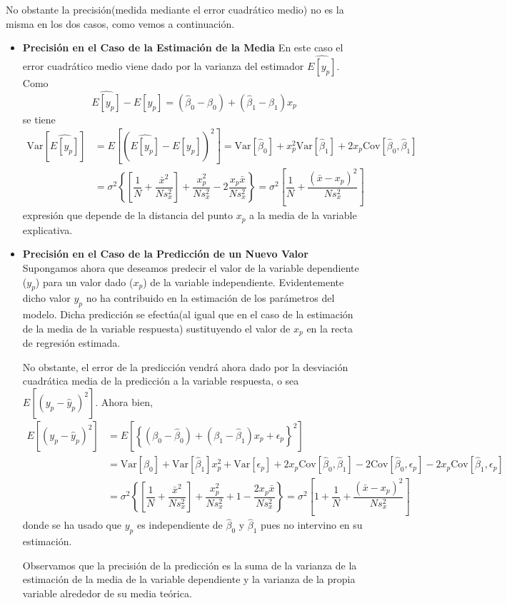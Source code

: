 \documentclass[10pt,a4paper]{book}
\begin{document}
No obstante la precisión(medida mediante el error cuadrático medio) no es la misma en los dos casos, como vemos a continuación.

\begin{itemize}
\item \textbf{Precisión en el Caso de la Estimación de la Media}
En este caso el error cuadrático medio viene dado por la varianza del estimador $\widehat{E[y_p]}$. Como $$\widehat{E[y_p]}-E[y_p]=(\widehat{\beta}_0-\beta_0)+(\widehat{\beta}_1-\beta_1)x_p$$ se tiene
\begin{equation*}
\begin{split}
\mathrm{Var}[\widehat{E[y_p]}]&=E[(\widehat{E[y_p]}-E[y_p])^2]=\mathrm{Var}[\widehat{\beta}_0]+x^2_p\mathrm{Var}[\widehat{\beta}_1]+2x_p\mathrm{Cov}[\widehat{\beta}_0,\widehat{\beta}_1]\\
&=\sigma^2\left\lbrace\left[\dfrac{1}{N}+\dfrac{\bar{x}^2}{Ns^2_x}\right]+\dfrac{x^2_p}{Ns^2_x}-2\dfrac{x_p\bar{x}}{Ns^2_x}\right\rbrace=\sigma^2\left[\dfrac{1}{N}+\dfrac{(\bar{x}-x_p)^2}{Ns^2_x}\right]
\end{split}
\end{equation*}
expresión que depende de la distancia del punto $x_p$ a la media de la variable explicativa.
\item \textbf{Precisión en el Caso de la Predicción de un Nuevo Valor}
Supongamos ahora que deseamos predecir el valor de la variable dependiente ($y_p$) para un valor dado ($x_p$) de la variable independiente. Evidentemente dicho valor $y_p$ no ha contribuido en la estimación de los parámetros del modelo. Dicha predicción se efectúa(al igual que en el caso de la estimación de la media de la variable respuesta) sustituyendo el valor de $x_p$ en la recta de regresión estimada.

No obstante, el error de la predicción vendrá ahora dado por la desviación cuadrática media de la predicción a la variable respuesta, o sea $E[(y_p-\widehat{y}_p)^2]$. Ahora bien,
\begin{equation*}
\begin{split}
E[(y_p-\widehat{y}_p)^2]&=E\left[\left\lbrace(\beta_0-\widehat{\beta}_0)+(\beta_1-\widehat{\beta}_1)x_p+\epsilon_p\right\rbrace^2\right]\\
&=\mathrm{Var}[\widehat{\beta}_0]+\mathrm{Var}[\widehat{\beta}_1]x^2_p+\mathrm{Var}[\epsilon_p]+2x_p\mathrm{Cov}[\widehat{\beta}_0,\widehat{\beta}_1]-2\mathrm{Cov}[\widehat{\beta}_0,\epsilon_p]-2x_p\mathrm{Cov}[\widehat{\beta}_1,\epsilon_p]\\
&=\sigma^2\left\lbrace\left[\dfrac{1}{N}+\dfrac{\bar{x}^2}{Ns^2_x}\right]+\dfrac{x^2_p}{Ns^2_x}+1-\dfrac{2x_p\bar{x}}{Ns^2_x}\right\rbrace=\sigma^2\left[1+\dfrac{1}{N}+\dfrac{(\bar{x}-x_p)^2}{Ns^2_x}\right]
\end{split}
\end{equation*}
donde se ha usado que $y_p$ es independiente de $\widehat{\beta}_0$ y $\widehat{\beta}_1$ pues no intervino en su estimación.

Observamos que la precisión de la predicción es la suma de la varianza de la estimación de la media de la variable dependiente y la varianza de la propia variable alrededor de su media teórica.
\end{itemize}		
\end{document}
